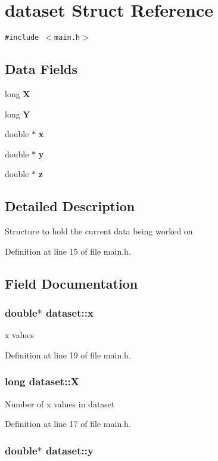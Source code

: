 \section{dataset Struct Reference}
\label{structdataset}
{\tt \#include $<$main.h$>$}

\subsection*{Data Fields}
\begin{CompactItemize}
\item 
long {\bf X}
\item 
long {\bf Y}
\item 
double $\ast$ {\bf x}
\item 
double $\ast$ {\bf y}
\item 
double $\ast$ {\bf z}
\end{CompactItemize}


\subsection{Detailed Description}
Structure to hold the current data being worked on 



Definition at line 15 of file main.h.

\subsection{Field Documentation}
\subsubsection{\setlength{\rightskip}{0pt plus 5cm}double$\ast$ {\bf dataset::x}}\label{structdataset_o2}


x values 

Definition at line 19 of file main.h.
\subsubsection{\setlength{\rightskip}{0pt plus 5cm}long {\bf dataset::X}}\label{structdataset_o0}


Number of x values in dataset 

Definition at line 17 of file main.h.
\subsubsection{\setlength{\rightskip}{0pt plus 5cm}double$\ast$ {\bf dataset::y}}\label{structdataset_o3}


